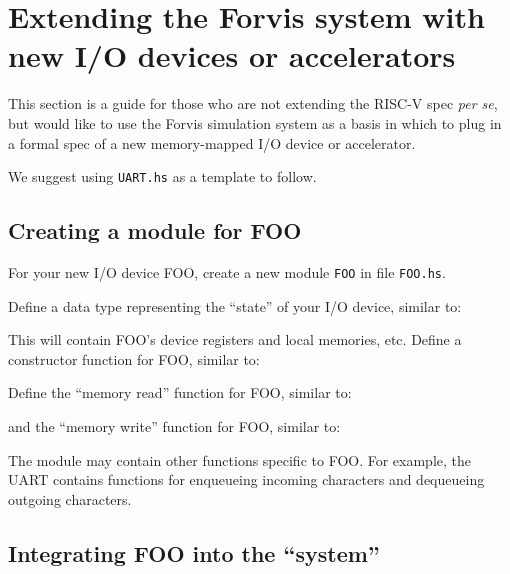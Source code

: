 \documentclass[11pt]{article}
\begin{document}

\newpage

\section{Extending the Forvis system with new I/O devices or accelerators}

\label{sec_accelerators}

This section is a guide for those who are not extending the RISC-V
spec \emph{per se}, but would like to use the Forvis simulation system
as a basis in which to plug in a formal spec of a new memory-mapped
I/O device or accelerator.

We suggest using \verb|UART.hs| as a template to follow.


\subsection{Creating a module for FOO}

For your new I/O device FOO, create a new module \verb|FOO| in file
\verb|FOO.hs|.

Define a data type representing the ``state'' of your I/O device, similar to:



This will contain FOO's device registers and local memories, etc.
Define a constructor function for FOO, similar to:



Define the ``memory read'' function for FOO, similar to:



and the ``memory write'' function for FOO, similar to:



The module may contain other functions specific to FOO.  For example,
the UART contains functions for enqueueing incoming characters and
dequeueing outgoing characters.


\subsection{Integrating FOO into the ``system''}
\end{document}
